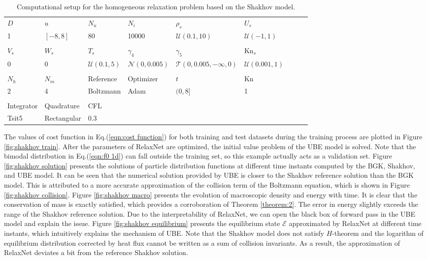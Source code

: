 \documentclass[preprint,3p,12pt,sort&compress]{elsarticle}
\begin{document}
\begin{table}[htbp]
	\caption{Computational setup for the homogeneous relaxation problem based on the Shakhov model.}
	\centering
	\begin{tabular}{lllllllll} 
	    \hline
	    $D$ & $u$ & $N_u$ & $N_i$ & $\rho_s$ & $U_s$ \\
	    1 & $[-8,8]$ & 80 & 10000 & $\mathcal U(0.1,10)$ & $\mathcal U(-1,1)$ \\
		\rule{0pt}{0ex}\\
		$V_s$ & $W_s$ & $T_s$ & $\gamma_4$ & $\gamma_5$ & $\mathrm{Kn}_s$ \\
		$0$ & $0$ & $\mathcal U(0.1,5)$ & $\mathcal N(0,0.005)$ & $\mathcal T(0,0.005,-\infty,0)$ & $\mathcal U(0.001,1)$ \\
		\rule{0pt}{0ex}\\
		$N_h$ & $N_m$ & Reference & Optimizer & $t$ & Kn \\
	    2 & 4 & Boltzmann & Adam & $(0,8]$ & 1 \\
		\rule{0pt}{0ex}\\
		Integrator & Quadrature & CFL \\
		Tsit5 & Rectangular & 0.3 \\
		\hline
	\end{tabular} 
	\label{tab:shakhov}
\end{table}

The values of cost function in Eq.(\ref{eqn:cost function}) for both training and test datasets during the training process are plotted in Figure \ref{fig:shakhov train}.
After the parameters of RelaxNet are optimized, the initial value problem of the UBE model is solved.
Note that the bimodal distribution in Eq.(\ref{eqn:f0 1d}) can fall outside the training set, so this example actually acts as a validation set.
Figure \ref{fig:shakhov solution} presents the solutions of particle distribution functions at different time instants computed by the BGK, Shakhov, and UBE model.
It can be seen that the numerical solution provided by UBE is closer to the Shakhov reference solution than the BGK model.
This is attributed to a more accurate approximation of the collision term of the Boltzmann equation, which is shown in Figure \ref{fig:shakhov collision}.
Figure \ref{fig:shakhov macro} presents the evolution of macroscopic density and energy with time.
It is clear that the conservation of mass is exactly satisfied, which provides a corroboration of Theorem \ref{theorem:2}.
The error in energy slightly exceeds the range of the Shakhov reference solution.
Due to the interpretability of RelaxNet, we can open the black box of forward pass in the UBE model and explain the issue.
Figure \ref{fig:shakhov equilibrium} presents the equilibrium state $\mathcal E$ approximated by RelaxNet at different time instants, which intuitively explains the mechanism of UBE.
Note that the Shakhov model does not satisfy $H$-theorem and the logarithm of equilibrium distribution corrected by heat flux cannot be written as a sum of collision invariants.
As a result, the approximation of RelaxNet deviates a bit from the reference Shakhov solution.
\end{document}
